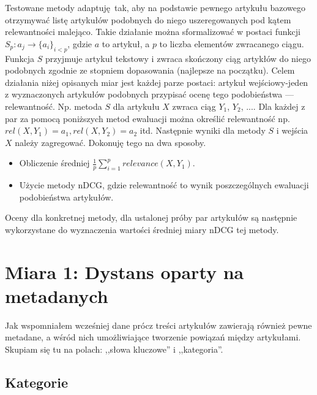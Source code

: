 \documentclass[pl]{minipw} %
\begin{document}
Testowane metody adaptuję tak, aby na podstawie pewnego artykułu bazowego otrzymywać listę artykułów podobnych do niego uszeregowanych pod kątem relewantności malejąco. Takie działanie można sformalizować w postaci funkcji $S_p: a_j \to \{a_{i}\}_{i < p}$, gdzie $a$ to artykuł, a $p$ to liczba elementów zwracanego ciągu. Funkcja $S$ przyjmuje artykuł tekstowy i zwraca skończony ciąg artykłów do niego podobnych zgodnie ze stopniem dopasowania (najlepsze na początku). Celem działania niżej opisanych miar jest każdej parze postaci: artykuł wejściowy-jeden z wyznaczonych artykułów podobnych przypisać ocenę tego podobieństwa --- relewantność. Np. metoda $S$ dla artykułu $X$ zwraca ciąg {$Y_1$, $Y_2$, ...}. Dla każdej z par za pomocą poniższych metod ewaluacji można określić relewantność np. $rel(X, Y_1) = a_1, rel(X, Y_2) = a_2$ itd. Następnie wyniki dla metody $S$ i wejścia $X$ należy zagregować. Dokonuję tego na dwa sposoby.
\begin{itemize}
	\item Obliczenie średniej $\frac{1}{p}\sum_{i=1}^{p}relevance(X,Y_1)$.
	\item Użycie metody nDCG, gdzie relewantność to wynik poszczególnych ewaluacji podobieństwa artykułów.
\end{itemize}  


Oceny dla konkretnej metody, dla ustalonej próby par artykułów są następnie wykorzystane do wyznaczenia wartości średniej  miary nDCG tej metody.


\section{Miara 1: Dystans oparty na metadanych}

Jak wspomniałem wcześniej dane prócz treści artykułów zawierają również pewne metadane, a wśród nich umożliwiające tworzenie powiązań między artykułami. Skupiam się tu na polach: ,,słowa kluczowe'' i ,,kategoria''.

\subsection{Kategorie} 
\end{document}
